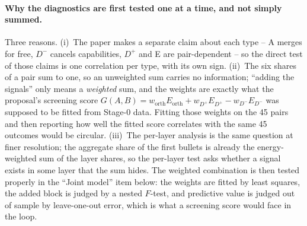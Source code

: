 \documentclass[11pt,a4paper]{article}
\newcommand{\Dp}{D^{+}}
\newcommand{\Dm}{D^{-}}
\begin{document}
\paragraph{Why the diagnostics are first tested one at a time, and not simply summed.} Three reasons. (i)~The paper makes a separate claim about each type -- A merges for free, $\Dm$ cancels capabilities, $\Dp$ and E are pair-dependent -- so the direct test of those claims is one correlation per type, with its own sign. (ii)~The six shares of a pair sum to one, so an unweighted sum carries no information; ``adding the signals'' only means a \emph{weighted} sum, and the weights are exactly what the proposal's screening score $G(A,B)=w_{\mathrm{orth}}E_{\mathrm{orth}}+w_{\Dp}E_{\Dp}-w_{\Dm}E_{\Dm}$ was supposed to be fitted from Stage-0 data. Fitting those weights on the 45 pairs and then reporting how well the fitted score correlates with the same 45 outcomes would be circular. (iii)~The per-layer analysis is the same question at finer resolution; the aggregate share of the first bullets is already the energy-weighted sum of the layer shares, so the per-layer test asks whether a signal exists in some layer that the sum hides. The weighted combination is then tested properly in the ``Joint model'' item below: the weights are fitted by least squares, the added block is judged by a nested $F$-test, and predictive value is judged out of sample by leave-one-out error, which is what a screening score would face in the loop.
\end{document}
